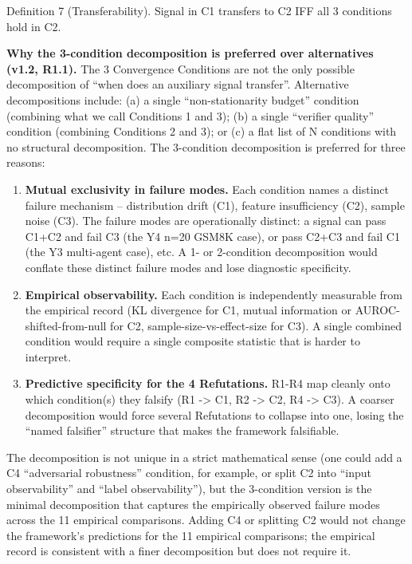 \documentclass[
]{article}
\begin{document}
Definition 7 (Transferability). Signal in C1 transfers to C2 IFF all 3
conditions hold in C2.

\textbf{Why the 3-condition decomposition is preferred over alternatives
(v1.2, R1.1).} The 3 Convergence Conditions are not the only possible
decomposition of ``when does an auxiliary signal transfer''. Alternative
decompositions include: (a) a single ``non-stationarity budget''
condition (combining what we call Conditions 1 and 3); (b) a single
``verifier quality'' condition (combining Conditions 2 and 3); or (c) a
flat list of N conditions with no structural decomposition. The
3-condition decomposition is preferred for three reasons:

\begin{enumerate}
\def\labelenumi{\arabic{enumi}.}
\item
  \textbf{Mutual exclusivity in failure modes.} Each condition names a
  distinct failure mechanism -- distribution drift (C1), feature
  insufficiency (C2), sample noise (C3). The failure modes are
  operationally distinct: a signal can pass C1+C2 and fail C3 (the Y4
  n=20 GSM8K case), or pass C2+C3 and fail C1 (the Y3 multi-agent case),
  etc. A 1- or 2-condition decomposition would conflate these distinct
  failure modes and lose diagnostic specificity.
\item
  \textbf{Empirical observability.} Each condition is independently
  measurable from the empirical record (KL divergence for C1, mutual
  information or AUROC-shifted-from-null for C2,
  sample-size-vs-effect-size for C3). A single combined condition would
  require a single composite statistic that is harder to interpret.
\item
  \textbf{Predictive specificity for the 4 Refutations.} R1-R4 map
  cleanly onto which condition(s) they falsify (R1 -\textgreater{} C1,
  R2 -\textgreater{} C2, R4 -\textgreater{} C3). A coarser decomposition
  would force several Refutations to collapse into one, losing the
  ``named falsifier'' structure that makes the framework falsifiable.
\end{enumerate}

The decomposition is not unique in a strict mathematical sense (one
could add a C4 ``adversarial robustness'' condition, for example, or
split C2 into ``input observability'' and ``label observability''), but
the 3-condition version is the minimal decomposition that captures the
empirically observed failure modes across the 11 empirical comparisons.
Adding C4 or splitting C2 would not change the framework's predictions
for the 11 empirical comparisons; the empirical record is consistent
with a finer decomposition but does not require it.
\end{document}
